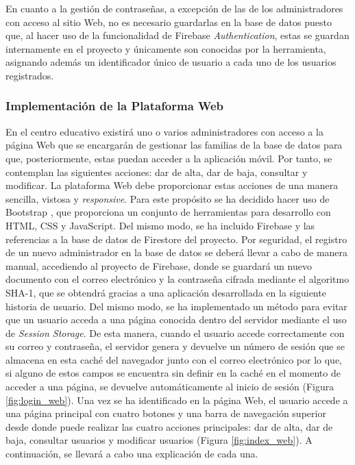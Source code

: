En cuanto a la gestión de contraseñas, a excepción de las de los administradores con acceso al sitio Web, no es necesario guardarlas en la base de datos  puesto que, al hacer uso de la funcionalidad de Firebase \textit{Authentication}, estas se guardan internamente en el proyecto y únicamente son conocidas por la herramienta, asignando además un identificador único de usuario a cada uno de los usuarios registrados.

\subsubsection{Implementación de la Plataforma Web}
En el centro educativo existirá uno o varios administradores con acceso a la página Web que se encargarán de gestionar las familias de la base de datos para que, posteriormente, estas puedan acceder a la aplicación móvil. Por tanto, se contemplan las siguientes acciones: dar de alta, dar de baja, consultar y modificar. La plataforma Web debe proporcionar estas acciones de una manera sencilla, vistosa y \textit{responsive}. Para este propósito se ha decidido hacer uso de Bootstrap \cite{Bootstrap}, que proporciona un conjunto de herramientas para desarrollo con HTML, CSS y JavaScript. Del mismo modo, se ha incluido Firebase y las referencias a la base de datos de Firestore del proyecto. Por seguridad, el registro de un nuevo administrador en la base de datos se deberá llevar a cabo de manera manual, accediendo al proyecto de Firebase, donde se guardará un nuevo documento con el correo electrónico y la contraseña cifrada mediante el algoritmo SHA-1, que se obtendrá gracias a una aplicación desarrollada en la siguiente historia de usuario. Del mismo modo, se ha implementado un método para evitar que un usuario acceda a una página conocida dentro del servidor mediante el uso de \textit{Session Storage}. De esta manera, cuando el usuario accede correctamente con su correo y contraseña, el servidor genera y devuelve un número de sesión que se almacena en esta caché del navegador junto con el correo electrónico por lo que, si alguno de estos campos se encuentra sin definir en la caché en el momento de acceder a una página, se devuelve automáticamente al inicio de sesión (Figura \ref{fig:login_web}). Una vez se ha identificado en la página Web, el usuario accede a una página principal con cuatro botones y una barra de navegación superior desde donde puede realizar las cuatro acciones principales: dar de alta, dar de baja, consultar usuarios y modificar usuarios (Figura \ref{fig:index_web}). A continuación, se llevará a cabo una explicación de cada una.

